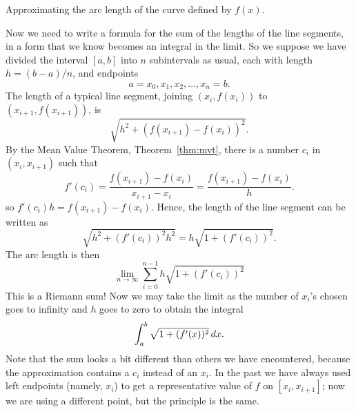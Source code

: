 \begin{marginfigure}[0in]
\caption{Approximating the arc length of the curve defined by $f(x)$.}
\label{fig:approximating arc length}
\end{marginfigure}

Now we need to write a formula for the sum of the lengths of the line
segments, in a form that we know becomes an integral in the limit.  So
we suppose we have divided the interval $[a,b]$ into $n$ subintervals
as usual, each with length $h=(b-a)/n$, and endpoints 
\[
a=x_0, x_1, x_2, \dots, x_n=b.
\]
The length of a typical line segment, joining $(x_i,f(x_i))$ to $
(x_{i+1},f(x_{i+1}))$, is 
\[
\sqrt{h^2 +(f(x_{i+1})-f(x_i))^2}.
\]
By the Mean Value Theorem, Theorem~\ref{thm:mvt}, there is a number $c_i$
in $(x_i,x_{i+1})$ such that 
\[
f'(c_i)=\frac{f(x_{i+1})-f(x_i)}{x_{i+1}-x_i} = \frac{f(x_{i+1})-f(x_i)}{h}.
\]
so $f'(c_i)h=f(x_{i+1})-f(x_i).$ Hence, the length of the line segment
can be written as
$$
  \sqrt{h^2 + (f'(c_i))^2h^2}=
  h\sqrt{1+(f'(c_i))^2}.
$$ 
The arc length is then
\[
\lim_{n\to\infty}\sum_{i=0}^{n-1} h\sqrt{1+(f'(c_i))^2} 
\]
This is a Riemann sum! Now we may take the limit as the number of
$x_i$'s chosen goes to infinity and $h$ goes to zero to obtain the
integral
\[
  \int_a^b \sqrt{1+(f'(x))^2}\, d x.
\]
Note that the sum looks a bit different than others we have
encountered, because the approximation contains a $c_i$ instead of an
$x_i$. In the past we have always used left endpoints (namely, $x_i$)
to get a representative value of $f$ on $[x_i,x_{i+1}]$; now we are
using a different point, but the principle is the same.

